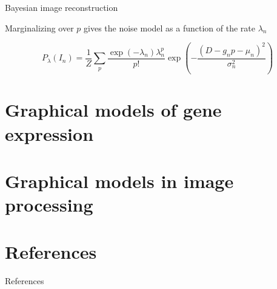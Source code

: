 \documentclass{beamer}					%
\begin{document}
\begin{frame}{Bayesian image reconstruction}

Marginalizing over $p$ gives the noise model as a function of the rate $\lambda_{n}$

\begin{equation*}
P_{\lambda}(I_{n}) = \frac{1}{Z}\sum_{p}\frac{\exp\left({-\lambda_{n}}\right)\lambda_{n}^{p}}{p!}\exp\left(-\frac{(D-g_{n}p-\mu_{n})^{2}}{\sigma_{n}^{2}}\right)
\end{equation*}



\end{frame}




\section{Graphical models of gene expression}




\section{Graphical models in image processing}



\section{References}

\begin{frame}[allowframebreaks]{References}
	\tiny
	
\end{frame}
\end{document}
